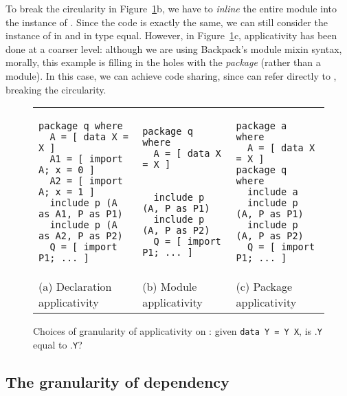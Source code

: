 \documentclass{article}
\begin{document}
To break the circularity in Figure~\ref{fig:applicativity}b, we have to \emph{inline}
the entire module  into the instance of .  Since the code is exactly
the same, we can still consider the instance of  in  and in 
type equal.  However, in Figure~\ref{fig:applicativity}c, applicativity has been
done at a coarser level: although we are using Backpack's module mixin syntax,
morally, this example is filling in the holes with the \emph{package} 
(rather than a module).  In this case, we can achieve code sharing, since
 can refer directly to , breaking the circularity.

    \begin{savenotes}
\begin{figure}
    \begin{tabular}{C C C}
\begin{verbatim}
package q where
  A = [ data X = X ]
  A1 = [ import A; x = 0 ]
  A2 = [ import A; x = 1 ]
  include p (A as A1, P as P1)
  include p (A as A2, P as P2)
  Q = [ import P1; ... ]
\end{verbatim}
&
\begin{verbatim}
package q where
  A = [ data X = X ]


  include p (A, P as P1)
  include p (A, P as P2)
  Q = [ import P1; ... ]
\end{verbatim}
&
\begin{verbatim}
package a where
  A = [ data X = X ]
package q where
  include a
  include p (A, P as P1)
  include p (A, P as P2)
  Q = [ import P1; ... ]
\end{verbatim}
  \\
  (a) Declaration applicativity  &
  (b) Module applicativity  &
  (c) Package applicativity  \\
\end{tabular}
\caption{Choices of granularity of applicativity on : given \texttt{data Y = Y X},  is .\texttt{Y} equal to .\texttt{Y}?}\label{fig:applicativity}
\end{figure}
\end{savenotes}

\subsection{The granularity of dependency}
\end{document}
